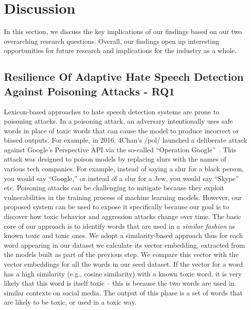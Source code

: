 \section{Discussion}
In this section, we discuss the key implications of our findings based on our two overarching research questions. Overall, our findings open up interesting opportunities for future research and implications for the industry as a whole.

\subsection{Resilience Of Adaptive Hate Speech Detection Against Poisoning Attacks - RQ1}
Lexicon-based approaches to hate speech detection systems are prone to poisoning attacks.
In a poisoning attack, an adversary intentionally uses safe words in place of toxic words that can cause the model to produce incorrect or biased outputs.
For example, in 2016, 4Chan's /pol/ launched a deliberate attack against Google's Perspective API via the so-called ``Operation Google''~\cite{hine2017kek,operationgoogle}. This attack was designed to poison models by replacing slurs with the names of various tech companies.
For example, instead of saying a slur for a black person, you would say ``Google,'' or instead of a slur for a Jew, you would say ``Skype'' etc.
Poisoning attacks can be challenging to mitigate because they exploit vulnerabilities in the training process of machine learning models.
However, our proposed system can be used to expose it specifically because our goal is to discover how toxic behavior and aggression attacks change over time.
The basic core of our approach is to identify words that are used in a \textit{similar fashion} as known toxic and toxic ones.
We adopt a similarity-based approach thus for each word appearing in our dataset we calculate its vector embedding, extracted from the models built as part of the previous step. We compare this vector with the vector embeddings for all the words in our seed dataset. If the vector for a word has a high similarity (e.g., cosine similarity) with a known toxic word, it is very likely that this word is itself toxic – this is because the two words are used in similar contexts on social media. The output of this phase is a set of words that are likely to be toxic, or used in a toxic way.

